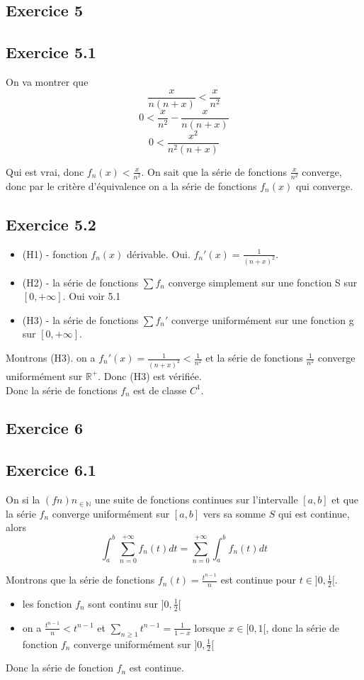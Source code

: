 \documentclass[]{book}
\theoremstyle{definition}
\newcommand{\bb}[1]{\mathbb{#1}}
\newcommand{\R}{\bb{R}}
\newcommand{\N}{\bb{N}}
\begin{document}
\subsection*{Exercice 5}
\subsection*{Exercice 5.1}
On va montrer que 
$$\frac{x}{n(n+x)} < \frac{x}{n^2}$$
$$0 < \frac{x}{n^2} - \frac{x}{n(n+x)}$$
$$0 < \frac{x^2}{n^2(n+x)}$$

Qui est vrai, donc $f_n(x) < \frac{x}{n^2}$. On sait que la s\'erie de fonctions $\frac{x}{n^2}$ converge, donc par le crit\`ere d'\'equivalence on a la s\'erie de fonctions $f_n(x)$ qui converge.

\subsection*{Exercice 5.2}
\begin{itemize}
\item (H1) - fonction $f_n(x)$ d\'erivable. Oui. $f_n'(x) = \frac{1}{(n+x)^2}$.
\item (H2) - la s\'erie de fonctions $\sum {f_n}$ converge simplement sur une fonction S sur $[0,+\infty]$. Oui voir 5.1
\item (H3) - la s\'erie de fonctions $\sum {f_n'}$ converge uniform\'ement sur une fonction g sur $[0,+\infty]$.
\end{itemize}

Montrons (H3). on a $f_n'(x) = \frac{1}{(n+x)^2} < \frac{1}{n^2}$ et la s\'erie de fonctions $\frac{1}{n^2}$ converge uniform\'ement sur $\R^+$. Donc (H3) est v\'erifi\'ee.\\

Donc la s\'erie de fonctions $f_n$ est de classe $C^1$.

\subsection*{Exercice 6}
\subsection*{Exercice 6.1}
On si la $(fn)n_{\in \N}$ une suite de fonctions continues sur l'intervalle $[a,b]$ et que la s\'erie $f_n$ converge uniform\'ement sur $[a, b]$ vers sa somme $S$ qui est continue, alors
$$\int_{a}^{b} \sum_{n=0}^{+\infty}f_n(t) dt =  \sum_{n=0}^{+\infty} \int_{a}^{b} f_n(t) dt $$ 

Montrons que la s\'erie de fonctions $f_n(t)=\frac{t^{n-1}}{n}$ est continue pour $t \in ]0,\frac{1}{2}[$. 
\begin{itemize}
\item les fonction $f_n$ sont continu sur $]0,\frac{1}{2}[$
\item on a $\frac{t^{n-1}}{n} < t^{n-1}$ et $\sum_{n \geq 1}t^{n-1} = \frac{1}{1-x}$ lorsque $x \in [0,1[$, donc la s\'erie de fonction $f_n$ converge uniform\'ement sur $]0,\frac{1}{2}[$
\end{itemize}
Donc la s\'erie de fonction $f_n$ est continue.\\
\end{document}
